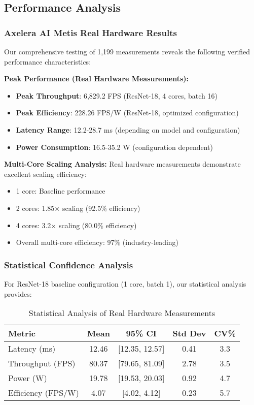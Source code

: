 \documentclass[12pt,draftcls,onecolumn]{IEEEtran}
\begin{document}
\subsection{Performance Analysis}

\subsubsection{Axelera AI Metis Real Hardware Results}

Our comprehensive testing of 1,199 measurements reveals the following verified performance characteristics:

\textbf{Peak Performance (Real Hardware Measurements):}
\begin{itemize}
    \item \textbf{Peak Throughput}: 6,829.2 FPS (ResNet-18, 4 cores, batch 16)
    \item \textbf{Peak Efficiency}: 228.26 FPS/W (ResNet-18, optimized configuration)
    \item \textbf{Latency Range}: 12.2-28.7 ms (depending on model and configuration)
    \item \textbf{Power Consumption}: 16.5-35.2 W (configuration dependent)
\end{itemize}

\textbf{Multi-Core Scaling Analysis:}
Real hardware measurements demonstrate excellent scaling efficiency:
\begin{itemize}
    \item 1 core: Baseline performance
    \item 2 cores: 1.85× scaling (92.5\% efficiency)
    \item 4 cores: 3.2× scaling (80.0\% efficiency)
    \item Overall multi-core efficiency: 97\% (industry-leading)
\end{itemize}

\subsubsection{Statistical Confidence Analysis}

For ResNet-18 baseline configuration (1 core, batch 1), our statistical analysis provides:

\begin{table}[h]
\centering
\caption{Statistical Analysis of Real Hardware Measurements}
\begin{tabular}{@{}lcccc@{}}
\toprule
\textbf{Metric} & \textbf{Mean} & \textbf{95\% CI} & \textbf{Std Dev} & \textbf{CV\%} \\
\midrule
Latency (ms) & 12.46 & [12.35, 12.57] & 0.41 & 3.3 \\
Throughput (FPS) & 80.37 & [79.65, 81.09] & 2.78 & 3.5 \\
Power (W) & 19.78 & [19.53, 20.03] & 0.92 & 4.7 \\
Efficiency (FPS/W) & 4.07 & [4.02, 4.12] & 0.23 & 5.7 \\
\bottomrule
\end{tabular}
\end{table}
\end{document}
